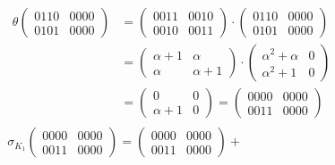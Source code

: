 \documentclass[fleqn]{article}
\begin{document}
\begin{equation*}
\begin{aligned}
            &\begin{aligned} 
                \theta 
                \begin{pmatrix}
                    0110 & 0000 \\
                    0101 & 0000
                \end{pmatrix} &=
                \begin{pmatrix}
                    0011 & 0010 \\
                    0010 & 0011
                \end{pmatrix} \cdot
                \begin{pmatrix}
                    0110 & 0000 \\
                    0101 & 0000
                \end{pmatrix} \\ &= 
                 \begin{pmatrix}
                    \alpha + 1 & \alpha \\
                    \alpha & \alpha + 1
                 \end{pmatrix} \cdot
                    \begin{pmatrix} 
                        \alpha^2 + \alpha & 0 \\
                        \alpha^2 + 1 & 0
                    \end{pmatrix} \\ &=
                    \begin{pmatrix}
                        0 & 0 \\
                        \alpha + 1 & 0
                    \end{pmatrix} = 
                    \begin{pmatrix}
                        0000 & 0000 \\
                        0011 & 0000
                    \end{pmatrix}
            \end{aligned} \\
            &\sigma_{K_1} \begin{pmatrix}
                0000 & 0000 \\
                0011 & 0000
            \end{pmatrix} =
            \begin{pmatrix}
                0000 & 0000 \\
                0011 & 0000
            \end{pmatrix} +

\end{aligned}
\end{equation*}
\end{document}

